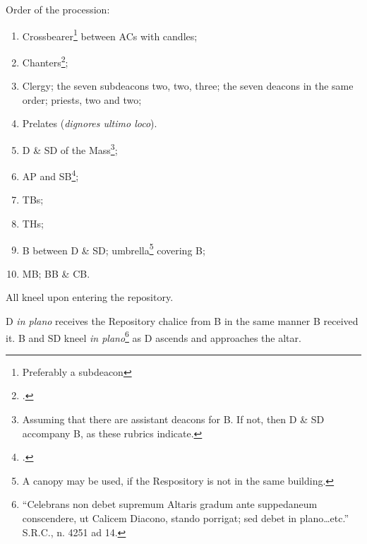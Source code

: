 \documentclass{report}
\begin{document}
\begin{multicols}{2}
    \rubric Order of the procession:

    \begin{enumerate}
    
        \item Crossbearer\footnote{Preferably a subdeacon} between ACs with
            candles;

        \item Chanters\footcite[``If they are clerics; if not they precede the
            cross-bearer''.][p. 191]{stehle};

        \item Clergy; the seven subdeacons two, two, three; the seven deacons
            in the same order; priests, two and two;

        \item Prelates (\textit{dignores ultimo loco}).

        \item D \& SD of the Mass\footnote{Assuming that there are assistant
            deacons for B. If not, then D \& SD accompany B, as these rubrics
            indicate.};

        \item AP and SB\footcite[``If the width of the aisle permits, the
            assistant priest may walk at the right of the bishop, slighlty in
            advance of the assistant deacon, and the staff-bearer may walk
            between the thurifers.''][footnote 2]{stehle};

        \item TBs;

        \item THs;

        \item B between D \& SD; umbrella\footnote{A canopy may be used, if the
            Respository is not in the same building.} covering B;

        \item MB; BB \& CB.

    \end{enumerate}

    \rubric All kneel upon entering the repository.

    \rubric D \textit{in plano} receives the Repository chalice from B in the
    same manner B received it. B and SD kneel \textit{in
    plano}\footnote{``Celebrans non debet supremum Altaris gradum ante
    suppedaneum conscendere, ut Calicem Diacono, stando porrigat; sed debet in
    plano\dots etc.'' S.R.C., n. 4251 ad 14.} as D ascends and approaches the
    altar.


\end{multicols}
\end{document}
